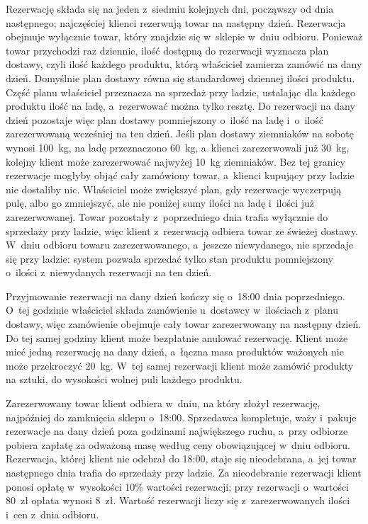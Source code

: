 \documentclass[12pt,a4paper,oneside]{article}
\newcounter{pu}
\begin{document}
Rezerwację składa się na jeden z~siedmiu kolejnych dni, począwszy od dnia następnego; najczęściej klienci rezerwują towar na następny dzień. Rezerwacja obejmuje wyłącznie towar, który znajdzie się w~sklepie w~dniu odbioru. Ponieważ towar przychodzi raz dziennie, ilość dostępną do rezerwacji wyznacza plan dostawy, czyli ilość każdego produktu, którą właściciel zamierza zamówić na dany dzień. Domyślnie plan dostawy równa się standardowej dziennej ilości produktu. Część planu właściciel przeznacza na sprzedaż przy ladzie, ustalając dla każdego produktu ilość na ladę, a~rezerwować można tylko resztę. Do rezerwacji na dany dzień pozostaje więc plan dostawy pomniejszony o~ilość na ladę i~o~ilość zarezerwowaną wcześniej na ten dzień. Jeśli plan dostawy ziemniaków na sobotę wynosi 100~kg, na ladę przeznaczono 60~kg, a~klienci zarezerwowali już 30~kg, kolejny klient może zarezerwować najwyżej 10~kg ziemniaków. Bez tej granicy rezerwacje mogłyby objąć cały zamówiony towar, a~klienci kupujący przy ladzie nie dostaliby nic. Właściciel może zwiększyć plan, gdy rezerwacje wyczerpują pulę, albo go zmniejszyć, ale nie poniżej sumy ilości na ladę i~ilości już zarezerwowanej. Towar pozostały z~poprzedniego dnia trafia wyłącznie do sprzedaży przy ladzie, więc klient z~rezerwacją odbiera towar ze świeżej dostawy. W~dniu odbioru towaru zarezerwowanego, a~jeszcze niewydanego, nie sprzedaje się przy ladzie: system pozwala sprzedać tylko stan produktu pomniejszony o~ilości z~niewydanych rezerwacji na ten dzień.

Przyjmowanie rezerwacji na dany dzień kończy się o~18:00 dnia poprzedniego. O~tej godzinie właściciel składa zamówienie u~dostawcy w~ilościach z~planu dostawy, więc zamówienie obejmuje cały towar zarezerwowany na następny dzień. Do tej samej godziny klient może bezpłatnie anulować rezerwację. Klient może mieć jedną rezerwację na dany dzień, a~łączna masa produktów ważonych nie może przekroczyć 20~kg. W~tej samej rezerwacji klient może zamówić produkty na sztuki, do wysokości wolnej puli każdego produktu.

Zarezerwowany towar klient odbiera w~dniu, na który złożył rezerwację, najpóźniej do zamknięcia sklepu o~18:00. Sprzedawca kompletuje, waży i~pakuje rezerwacje na dany dzień poza godzinami największego ruchu, a~przy odbiorze pobiera zapłatę za odważoną masę według ceny obowiązującej w~dniu odbioru. Rezerwacja, której klient nie odebrał do 18:00, staje się nieodebrana, a~jej towar następnego dnia trafia do sprzedaży przy ladzie. Za nieodebranie rezerwacji klient ponosi opłatę w~wysokości 10\% wartości rezerwacji; przy rezerwacji o~wartości 80~zł opłata wynosi 8~zł. Wartość rezerwacji liczy się z~zarezerwowanych ilości i~cen z~dnia odbioru.
\end{document}
